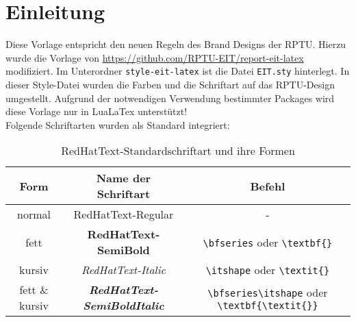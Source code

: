 \section{Einleitung} \label{Einleitung} \thispagestyle{firstsection}
Diese Vorlage entspricht den neuen Regeln des Brand Designs der RPTU.
Hierzu wurde die Vorlage von \url{https://github.com/RPTU-EIT/report-eit-latex} modifiziert.
Im Unterordner \texttt{style-eit-latex} ist die Datei \texttt{EIT.sty} hinterlegt.
In dieser Style-Datei wurden die Farben und die Schriftart auf das RPTU-Design umgestellt.
Aufgrund der notwendigen Verwendung bestimmter Packages wird diese Vorlage nur in LuaLaTex unterstützt!\\
Folgende Schriftarten wurden als Standard integriert:
\begin{table}[ht]
    \label{tab:Standardschriftart}
    \caption{RedHatText-Standardschriftart und ihre Formen}
    \centering
    \footnotesize
    \begin{tabular}{@{}ccc@{}}
    \toprule
    Form            & Name der Schriftart                           & Befehl\\ \midrule
    normal          & RedHatText-Regular                            & - \\
    fett            & \textbf{RedHatText-SemiBold}                  & \verb|\bfseries| oder \verb|\textbf{}|\\
    kursiv          & \textit{RedHatText-Italic}                    & \verb|\itshape| oder \verb|\textit{}|\\
    fett \& kursiv  & \textbf{\textit{RedHatText-SemiBoldItalic}}   & \verb|\bfseries\itshape| oder \verb|\textbf{\textit{}}|\\ \bottomrule
    \end{tabular}
\end{table}

